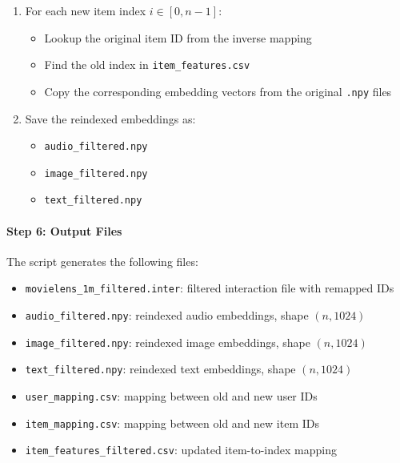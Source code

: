 \begin{enumerate}
    \item For each new item index $i \in [0, n-1]$:
    \begin{itemize}
        \item Lookup the original item ID from the inverse mapping
        \item Find the old index in \texttt{item\_features.csv}
        \item Copy the corresponding embedding vectors from the original \texttt{.npy} files
    \end{itemize}
    \item Save the reindexed embeddings as:
    \begin{itemize}
        \item \texttt{audio\_filtered.npy}
        \item \texttt{image\_filtered.npy}
        \item \texttt{text\_filtered.npy}
    \end{itemize}
\end{enumerate}

\paragraph{Step 6: Output Files}
The script generates the following files:

\begin{itemize}
    \item \texttt{movielens\_1m\_filtered.inter}: filtered interaction file with remapped IDs
    \item \texttt{audio\_filtered.npy}: reindexed audio embeddings, shape $(n, 1024)$
    \item \texttt{image\_filtered.npy}: reindexed image embeddings, shape $(n, 1024)$
    \item \texttt{text\_filtered.npy}: reindexed text embeddings, shape $(n, 1024)$
    \item \texttt{user\_mapping.csv}: mapping between old and new user IDs
    \item \texttt{item\_mapping.csv}: mapping between old and new item IDs
    \item \texttt{item\_features\_filtered.csv}: updated item-to-index mapping
\end{itemize}

